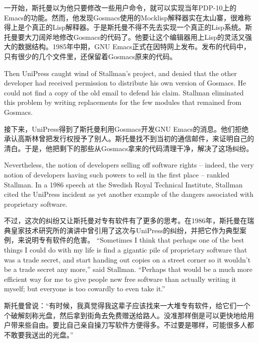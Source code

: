 \ifdefined\chs
一开始，斯托曼以为他只要修改一些用户命令，就可以实现当年PDP-10上的Emacs的功能。然而，他发现Gosmacs使用的Mocklisp解释器实在太山寨，很难称得上是个真正的Lisp解释器。于是斯托曼不得不先去实现一个真正的Lisp系统。斯托曼要大刀阔斧地修改Gosmacs的代码了。他要让这个编辑器用上Lisp的灵活又强大的数据结构。1985年中期，GNU Emacs正式在因特网上发布。发布的代码中，只有很少的几个文件里，还保留着Gosmacs原来的代码。
\fi

\ifdefined\eng
Then UniPress caught wind of Stallman's project, and denied that the other developer had received permission to distribute his own version of Gosmacs.  He could not find a copy of the old email to defend his claim.  Stallman eliminated this problem by writing replacements for the few modules that remained from Gosmacs.
\fi

\ifdefined\chs
接下来，UniPress得到了斯托曼利用Gosmacs开发GNU Emacs的消息。他们拒绝承认高斯林曾把发行权授予了别人。斯托曼找不到当初的通信邮件，来证明自己的清白。于是，他把剩下的那些从Gosmacs拿来的代码清理干净，解决了这场纠纷。
\fi

\ifdefined\eng
Nevertheless, the notion of developers selling off software rights -- indeed, the very notion of developers having such powers to sell in the first place -- rankled Stallman. In a 1986 speech at the Swedish Royal Technical Institute, Stallman cited the UniPress incident as yet another example of the dangers associated with proprietary software.
\fi

\ifdefined\chs
不过，这次的纠纷又让斯托曼对专有软件有了更多的思考。在1986年，斯托曼在瑞典皇家技术研究所的演讲中曾引用了这次与UniPress的纠纷，并把它作为典型案例，来说明专有软件的危害。
\fi
\fi
\ifdefined\eng
``Sometimes I think that perhaps one of the best things I could do with my life is find a gigantic pile of proprietary software that was a trade secret, and start handing out copies on a street corner so it wouldn't be a trade secret any more,'' said Stallman. ``Perhaps that would be a much more efficient way for me to give people new free software than actually writing it myself; but everyone is too cowardly to even take it.''
\fi

\ifdefined\chs
斯托曼曾说：``有时候，我真觉得我这辈子应该找来一大堆专有软件，给它们一个个破解刻称光盘，然后拿到街角去免费赠送给路人。没准那样倒是可以更快地给用户带来些自由。要比自己亲自操刀写软件方便得多。不过要是哪样，可能很多人都不敢要我送出的光盘。''
\fi


